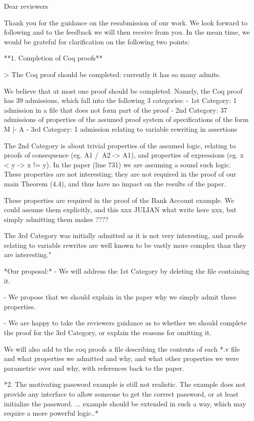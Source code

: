 
Dear reviewers 

Thank you for the guidance on the resubmission of our work. We look forward to following
and to the feedback we will then receive from you. In the mean time, we would be grateful
for clarification on the following two points:

**1. Completion of Coq proofs**

> The Coq proof should be completed: currently it has so many admits.

We believe that at most one proof should be completed. Namely, the Coq proof has 
39  admissions, which fall into the following 3 categories:
 - 1st Category: 1 admission in a file that does not form part of the proof 
- 2nd Category: 37 admissions of properties of the assumed proof system 
    of specifications of the form M |- A
- 3rd Category: 1 admission relating to variable rewriting in assertions

 
The 2nd Category is about trivial properties of the  assumed logic, relating to 
proofs of consequence  (eg. A1 /\ A2 -> A1), and properties of expressions 
(eg. x < y -> x != y). In the paper (line 731) we are assuming a sound such logic.
These properties are not interesting; they are not required in the proof of our main
Theorem (4.4), and thus have no impact on the results of the paper.

 These properties are required in the proof of the Bank Account example.  We
 could assume them explicitly, and this xxx JULIAN what write here xxx, but 
 simply admitting them makes ???? 
 


The 3rd Category was initially admitted as it is not very interesting, and proofs 
relating to variable rewrites are well known to be vastly more complex than they 
are interesting."

*Our proposal:*
- We will address the 1st Category  by deleting the file containing it.

- We propose that we should explain in the  paper why we simply admit these
properties.

- We are happy to take the reviewers guidance as to whether we should complete
the proof for the 3rd Category, or explain the reasons for omitting it.

We will also add to the coq proofs a file describing the contents of each *.v file 
and what properties we admitted and why, and what other properties we were
parametric over and why, with references back to the paper.

*2. The motivating password example is still not realistic. The example does not 
provide any interface to allow someone to get the correct password, or at 
least initialize the password. ... example should be extended in such a way, 
which may require a more powerful logic..*

